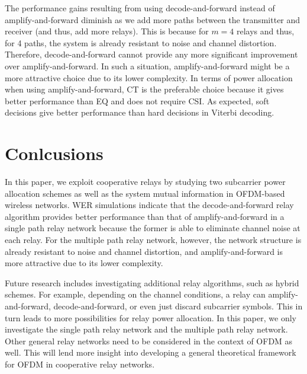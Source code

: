 \documentclass[journal]{IEEEtran}
\begin{document}
The performance gains
resulting from using decode-and-forward instead of
amplify-and-forward diminish as we add more paths between the
transmitter and receiver (and thus, add more relays). This is
because for $m=4$ relays and thus, for 4 paths, the system is
already resistant to noise and channel distortion.  Therefore,
decode-and-forward cannot provide any more significant improvement
over amplify-and-forward.  In such a situation,
amplify-and-forward might be a more attractive choice due to its
lower complexity.  In terms of power allocation when using
amplify-and-forward, CT is the preferable choice because it gives
better performance than EQ and does not require CSI.  As expected, soft decisions give better performance than hard
decisions in Viterbi decoding.


\section{Conlcusions}
\label{sec:conclusions}

In this paper, we exploit cooperative relays by studying two subcarrier power allocation schemes as well as the system mutual information in OFDM-based wireless networks.  WER simulations indicate that the decode-and-forward relay algorithm provides better performance than that of amplify-and-forward in a single path relay network because the former is able to eliminate channel noise at each relay.  For the multiple path relay network, however, the network structure is already resistant to noise and channel distortion, and amplify-and-forward is more attractive due to its lower complexity.

Future research includes investigating additional relay algorithms, such as hybrid schemes.  For example, depending on the channel conditions, a relay can amplify-and-forward, decode-and-forward, or even just discard subcarrier symbols.  This in turn leads to more possibilities for relay power allocation.  In this paper, we only investigate the single path relay network and the multiple path relay network.  Other general relay networks need to be considered in the context of OFDM as well.  This will lend more insight into developing a general theoretical framework for OFDM in cooperative relay networks.




\end{document}
